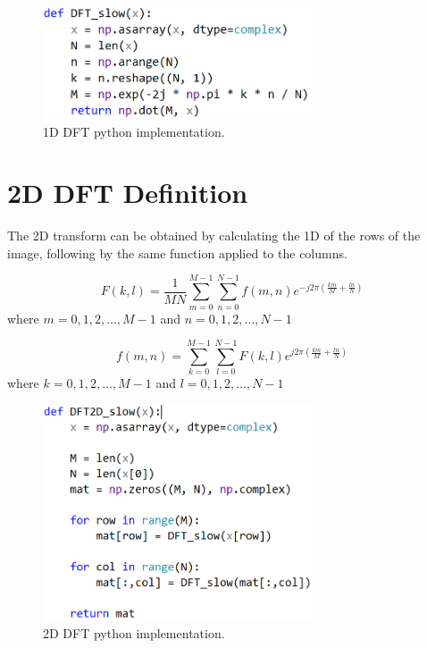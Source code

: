 \documentclass[12pt]{article}
\begin{document}

\begin{figure}[!htbp]
	\begin{center}
		\leavevmode
		\includegraphics[width=8cm]{images/dft.png}
		\caption{1D DFT python implementation.}
	\end{center}
\end{figure}

\section{2D DFT Definition}
The 2D transform can be obtained by calculating the 1D of the rows of the image, following by the same function applied to the columns.

\begin{equation}
F(k,l)=\frac{1}{MN}\sum_{m=0}^{M-1}\sum_{n=0}^{N-1} f(m,n) e^{-j 2\pi (\frac{km}{M} + \frac{ln}{N})}
\end{equation}
where $m = 0,1,2,\dots, M-1$ and $n = 0,1,2,\dots, N-1$

\begin{equation}
f(m,n)=\sum_{k=0}^{M-1}\sum_{l=0}^{N-1} F(k,l) e^{j 2\pi (\frac{km}{M} + \frac{ln}{N})}
\end{equation}
where $k = 0,1,2,\dots, M-1$ and $l = 0,1,2,\dots, N-1$

\begin{figure}[!htbp]
	\begin{center}
		\leavevmode
		\includegraphics[width=8cm]{images/dft2d.png}
		\caption{2D DFT python implementation.}
	\end{center}
\end{figure}
\end{document}
